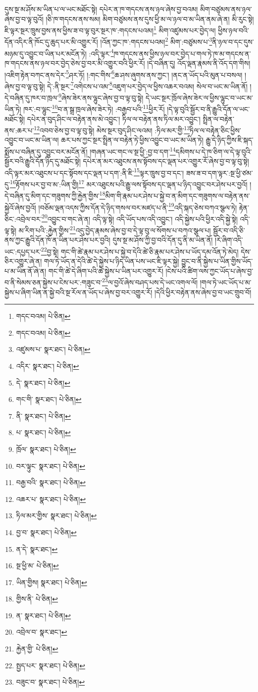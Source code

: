 དུས་སྔ་མ་ཤོས་མ་ཡིན་པ་ལ་ཡང་མཐོང་སྟེ། དཔེར་ན་ཁ་གདངས་ནས་ཉལ་ཞེས་བྱ་བའམ། མིག་བཙུམས་ནས་ཉལ་ཞེས་བྱ་བ་ལྟ་བུའོ། །ཅི་ཁ་གདངས་ནས་སམ། མིག་བཙུམས་ནས་དུས་ཕྱི་མ་ལ་ཉལ་བ་མ་ཡིན་ནམ་ཞེ་ན། མི་རུང་སྟེ། ཇི་ལྟར་སྔར་ཁྲུས་བྱས་ནས་ཕྱིས་ཟ་བ་ལྟ་བུར་སྔར་ཁ་:གདངས་པའམ།\footnote{གདང་བའམ།  པེ་ཅིན། } མིག་འཛུམས་པར་བྱེད་ལ། ཕྱིས་ཉལ་བའི་དོན་འདིར་ནི་ཁོང་དུ་ཆུད་པར་མི་འགྱུར་རོ། །འོན་ཀྱང་ཁ་:གདངས་པའམ།\footnote{གདང་བའམ།  པེ་ཅིན། } མིག་:བཙུམས་པ་\footnote{འཛུམས་པ་  སྣར་ཐང་།  པེ་ཅིན། }ནི་ཉལ་བ་དང་དུས་མཉམ་དུ་འབྱུང་བ་ཡིན་པར་མངོན་ཏེ། :འདི་ལྟར་\footnote{འདིར་  སྣར་ཐང་།  པེ་ཅིན། }ཁ་གདངས་ནས་ཕྱིས་ཉལ་བར་བྱེད་པ་གལ་ཏེ་ཁ་མ་གདངས་ན་ཁ་གདངས་ནས་ཉལ་བར་བྱེད་ཅེས་བྱ་བར་མི་འགྱུར་བའི་ཕྱིར་རོ། །དེ་བཞིན་དུ། འོད་ལྡན་རྣམས་ནི་འོད་དག་གིས། །འཇིག་རྟེན་བཀང་ནས་དེར་\footnote{དེ་  སྣར་ཐང་།  པེ་ཅིན། }ཤར་ཏོ། །:གང་གིས་\footnote{གང་གི་  སྣར་ཐང་།  པེ་ཅིན། }ཆ་ཤས་ཞུགས་ནས་ཀྱང་། །ནང་ན་ཡོད་པའི་མུན་པ་བསལ། །ཞེས་བྱ་བ་ལྟ་བུ་སྟེ། དེ་:ནི་སྔར་\footnote{ནི་  སྣར་ཐང་།  པེ་ཅིན། }འགེངས་པ་འམ་\footnote{པ་  སྣར་ཐང་།  པེ་ཅིན། }འཇུག་པར་བྱེད་ལ་ཕྱིས་འཆར་བའམ། སེལ་བ་ཡང་མ་ཡིན་ནོ། །དེ་བཞིན་དུ་ཁར་བ་ཁྲལ་\footnote{ཁྲོལ་  སྣར་ཐང་།  པེ་ཅིན། }ཞེས་ཟེར་ནས་ལྷུང་ཞེས་བྱ་བ་ལྟ་བུ་སྟེ། དེ་ཡང་སྔར་ཁྲོལ་ཞེས་ཟེར་ལ་ཕྱིས་ལྷུང་བ་ཡང་མ་ཡིན་ཏེ། ཁར་:བ་ལྷུང་\footnote{བར་ལྟུང་  སྣར་ཐང་།  པེ་ཅིན། }བ་ན་སྒྲ་ཁྲལ་ཞེས་ཟེར་ཏེ། :བརྒྱབ་པའི་\footnote{བརྒྱ་བའི་  སྣར་ཐང་།  པེ་ཅིན། }ཕྱིར་རོ། །དེ་ལྟ་བུའི་སྦྱོར་བ་ནི་རྒྱུའི་དོན་ལ་ཡང་མཐོང་སྟེ། དཔེར་ན་བུད་ཤིང་ལ་བརྟེན་ནས་མེ་འབྱུང་། ཏིལ་ལ་བརྟེན་ནས་ཏིལ་མར་འབྱུང་། སྤྲིན་ལ་བརྟེན་ནས་:ཆར་པ་\footnote{འཆར་པ་  སྣར་ཐང་།  པེ་ཅིན། }འབབ་ཅེས་བྱ་བ་ལྟ་བུ་སྟེ། མེས་སྔར་བུད་ཤིང་ལའམ། :ཏིལ་མར་གྱི་\footnote{ཏིལ་མར་གྱིས་  སྣར་ཐང་།  པེ་ཅིན། }ཏིལ་ལ་བརྟེན་ཅིང་ཕྱིས་འབྱུང་བ་ཡང་མ་ཡིན་ལ། ཆར་པས་ཀྱང་སྔར་སྤྲིན་ལ་བརྟེན་ཏེ་ཕྱིས་འབྱུང་བ་ཡང་མ་ཡིན་ཏེ། རྒྱུ་དེ་ཉིད་ཀྱིས་ཇི་སྐད་སྨོས་པ་བཞིན་དུ་འབྱུང་བར་མངོན་ནོ། །གཞན་ཡང་གང་ལ་སྔ་ཕྱི་:བྱ་བ་དག་\footnote{བྱ་བ་  སྣར་ཐང་།  པེ་ཅིན། }དམིགས་པ་དེ་ཁ་ཅིག་ལ་དེ་ལྟ་བུའི་སྦྱོར་བའི་རྒྱུའི་དོན་ཉིད་དུ་མཐོང་སྟེ། དཔེར་ན་མར་འཐུངས་ནས་སྟོབས་དང་ལྡན་པར་འགྱུར་རོ་ཞེས་བྱ་བ་ལྟ་བུ་སྟེ། འདི་ལྟར་མར་འཐུངས་པ་དང་སྟོབས་དང་ལྡན་པ་དག་:ནི་ཇི་\footnote{ན་དེ་  སྣར་ཐང་། }ལྟར་ཁྲུས་བྱ་བ་དང་། ཟས་ཟ་བ་དག་ལྟར་:སྔ་ཕྱི་ཙམ་དུ་\footnote{སྔ་ཕྱི་མ་  པེ་ཅིན། }རྟོགས་པར་བྱ་བ་མ་:ཡིན་གྱི།\footnote{ཡིན་གྱིས།  སྣར་ཐང་།  པེ་ཅིན། } མར་འཐུངས་པའི་རྒྱུ་ལས་སྟོབས་དང་ལྡན་པ་ཉིད་འབྱུང་བར་ཤེས་པར་བྱའོ། །དེ་བཞིན་དུ་མིག་དང་གཟུགས་ཀྱི་རྐྱེན་གྱིས་\footnote{གྱིས་ནི་  པེ་ཅིན། }མིག་གི་རྣམ་པར་ཤེས་པ་སྐྱེ་བ་ན་མིག་དང་གཟུགས་ལ་བརྟེན་ནས་སྐྱེའོ་ཞེས་བྱའོ། །བཅོམ་ལྡན་འདས་ཀྱིས་དོན་དེ་ཉིད་གསལ་བར་མཛད་པ་ནི་\footnote{ན་  སྣར་ཐང་།  པེ་ཅིན། }འདི་སྐད་ཅེས་བཀའ་སྩལ་ཏེ། རྟེན་ཅིང་:འབྲེལ་བར་\footnote{འབྲེལ་བ་  སྣར་ཐང་། }འབྱུང་བ་གང་ཞེ་ན། འདི་ལྟ་སྟེ། འདི་ཡོད་པས་འདི་འབྱུང་། འདི་སྐྱེས་པའི་ཕྱིར་འདི་སྐྱེ་སྟེ། འདི་ལྟ་སྟེ། མ་རིག་པའི་:རྐྱེན་གྱིས་\footnote{རྐྱེན་གྱི་  པེ་ཅིན། }འདུ་བྱེད་རྣམས་ཞེས་བྱ་བ་དེ་ལྟ་བུ་ལ་སོགས་པ་བཀའ་སྩལ་པ། སྦྱོར་བ་འདི་ཅི་ནས་ཀྱང་རྒྱུའི་དོན་ཁོ་ན་ཡིན་པར་ཤེས་པར་བྱའི། དུས་སྔ་མ་ཤོས་ཀྱི་བྱ་བའི་དོན་དུ་ནི་མ་ཡིན་ནོ། །རེ་ཞིག་འདི་ཡང་:དཔྱད་པར་\footnote{སྤྱད་པར་  སྣར་ཐང་།  པེ་ཅིན། }བྱ་སྟེ། གང་གི་ཚེ་རྣམ་པར་ཤེས་པ་སྐྱེ་བ་དེའི་ཚེ་ཅི་རྣམ་པར་ཤེས་པ་ཡོད་དམ་འོན་ཏེ་མེད། དེས་ཅིར་འགྱུར་ཞེ་ན། གལ་ཏེ་ཡོད་ན་དེའི་ཚེ་དེ་སྐྱེས་པ་ཉིད་ཡིན་པས་ཡང་ཇི་ལྟར་སྐྱེ། བྱུང་བ་ནི་སྐྱེས་པ་ཡིན་གྱིས་ཡོད་པ་མ་ཡིན་ནོ་ཞེ་ན། གང་གི་ཚེ་དེ་ཞིག་པའི་ཚེ་སྐྱེས་པ་ཡིན་པར་འགྱུར་རོ། །ངེས་པའི་ཚིག་ལས་ཀྱང་ཡོད་པ་ཞེས་བྱ་བ་ནི་སེམས་ཅན་སྐྱེས་པ་ངེས་པར་:གཟུང་བ་\footnote{བཟུང་བ་  སྣར་ཐང་།  པེ་ཅིན། }ལ་བྱའོ་ཞེས་བཤད་པས་དེ་ཡང་འགལ་ལོ། །གལ་ཏེ་ཡང་ཡོད་པ་མ་སྐྱེས་པ་ཞིག་ཡིན་ན་སྐྱེ་བའི་སྔ་རོལ་ན་ཡོད་པ་ཞེས་བྱ་བར་འགྱུར་རོ། །དེའི་ཕྱིར་བརྟེན་ནས་ཞེས་བྱ་བ་ཡང་གྲུབ་བོ། 